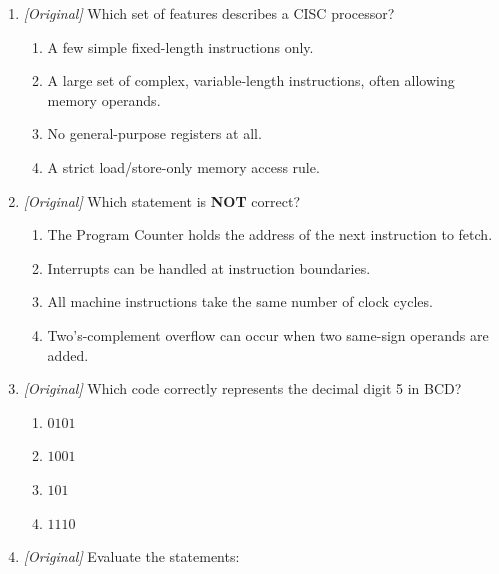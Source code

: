 \begin{enumerate}[label=\textbf{Q\arabic*.}, leftmargin=*]
  \begin{enumerate}[label=\Alph*.]
    \item Many complex, variable-length instructions.
    \item Instructions that always operate directly on memory operands.
    \item Microprogrammed control of highly complex instructions.
    \item Simple, mostly fixed-length instructions, many registers, and a
      load/store architecture.
  \end{enumerate}
\item \textit{[Original]} Which set of features describes a CISC processor?
  \begin{enumerate}[label=\Alph*.]
    \item A few simple fixed-length instructions only.
    \item A large set of complex, variable-length instructions, often
      allowing memory operands.
    \item No general-purpose registers at all.
    \item A strict load/store-only memory access rule.
  \end{enumerate}
\item \textit{[Original]} Which statement is \textbf{NOT} correct?
  \begin{enumerate}[label=\Alph*.]
    \item The Program Counter holds the address of the next instruction to
      fetch.
    \item Interrupts can be handled at instruction boundaries.
    \item All machine instructions take the same number of clock cycles.
    \item Two's-complement overflow can occur when two same-sign operands are
      added.
  \end{enumerate}
\item \textit{[Original]} Which code correctly represents the decimal digit 5
in BCD?
  \begin{enumerate}[label=\Alph*.]
    \item $0101$
    \item $1001$
    \item $101$
    \item $1110$
  \end{enumerate}
\item \textit{[Original]} Evaluate the statements:
  \begin{enumerate}[label=\Roman*.]

\end{enumerate}
\end{enumerate}

